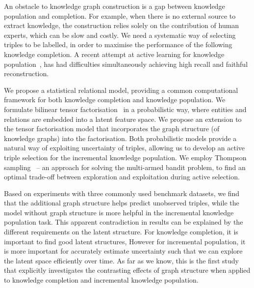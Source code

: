 An obstacle to knowledge graph construction is a gap between knowledge
population and completion. For example, when there is no external source to extract knowledge,
the construction relies solely on the contribution of human experts, which can be slow and costly.
We need a systematic way of selecting triples to be labelled, in order to maximise the performance of the following knowledge completion.
A recent attempt at active learning for knowledge population~\cite{kajino2015active},
has had difficulties simultaneously achieving high recall and faithful reconstruction.

We propose a statistical relational model, providing a common computational framework
for both knowledge completion and knowledge population.
We formulate bilinear tensor factorisation~\cite{nickel2015review} in a probabilistic way, where entities and relations are embedded into a latent feature space. We propose an extension to the tensor factorisation model that incorporates the graph structure (of knowledge graphs) into the factorisation. Both probabilistic models provide a natural way of exploiting uncertainty of triples, allowing us to develop
an active triple selection for the incremental knowledge population.
We employ Thompson sampling~\cite{scott10bandit} -- an approach for solving the multi-armed bandit problem,
to find an optimal trade-off between exploration and exploitation during active selection.

Based on experiments with three commonly used benchmark datasets, we find that the additional graph structure helps predict unobserved triples, while the model without graph structure is more helpful in the incremental knowledge population task.
This apparent contradiction in results can be explained by the different requirements on
the latent structure. For knowledge completion, it is important to find good latent structures,
However for incremental population, it is more important for accurately estimate uncertainty
such that we can explore the latent space efficiently over time.
As far as we know, this is the first study that explicitly investigates the contrasting
effects of graph structure when applied to knowledge completion and incremental knowledge population.

